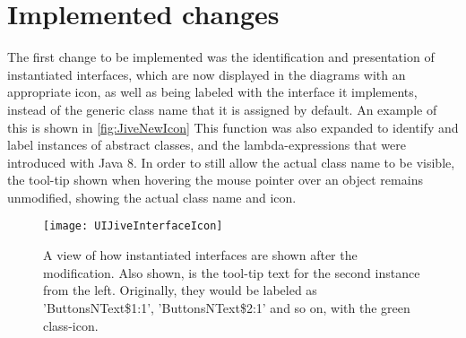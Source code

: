 \chapter{Implemented changes}\label{jiveImpl}%

The first change to be implemented was the identification and presentation of instantiated interfaces, which are now displayed in the diagrams with an appropriate icon, as well as being labeled with the interface it implements, instead of the generic class name that it is assigned by default.
An example of this is shown in \autoref{fig:JiveNewIcon}
This function was also expanded to identify and label instances of abstract classes, and the lambda-expressions that were introduced with Java 8.
In order to still allow the actual class name to be visible, the tool-tip shown when hovering the mouse pointer over an object remains unmodified, showing the actual class name and icon.
\begin{figure}[H]
	\centering
	\texttt{[image: UIJiveInterfaceIcon]}
	\caption[A view of how instantiated interfaces are shown after the modification.]{A view of how instantiated interfaces are shown after the modification. Also shown, is the tool-tip text for the second instance from the left. Originally, they would be labeled as 'ButtonsNText\$1:1', 'ButtonsNText\$2:1' and so on, with the green class-icon.}
	\label{fig:JiveNewIcon}
\end{figure}

